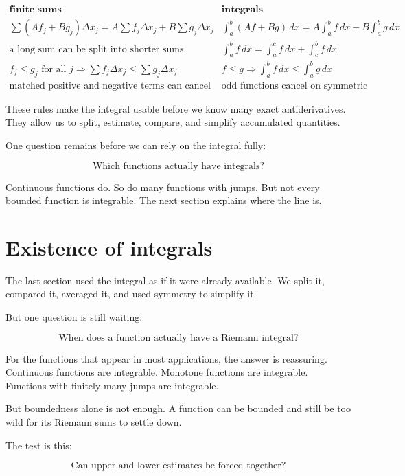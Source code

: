 \[
\begin{array}{c|c}
\textbf{finite sums} & \textbf{integrals} \\ \hline
\sum (Af_j+Bg_j)\Delta x_j
=
A\sum f_j\Delta x_j+B\sum g_j\Delta x_j
&
\int_a^b (Af+Bg)\,dx
=
A\int_a^b f\,dx+B\int_a^b g\,dx
\\[2mm]
\text{a long sum can be split into shorter sums}
&
\int_a^b f\,dx
=
\int_a^c f\,dx+\int_c^b f\,dx
\\[2mm]
f_j\le g_j \text{ for all }j
\Rightarrow
\sum f_j\Delta x_j\le \sum g_j\Delta x_j
&
f\le g
\Rightarrow
\int_a^b f\,dx\le \int_a^b g\,dx
\\[2mm]
\text{matched positive and negative terms can cancel}
&
\text{odd functions cancel on symmetric intervals}
\end{array}
\]

These rules make the integral usable before we know many exact antiderivatives.  They
allow us to split, estimate, compare, and simplify accumulated quantities.

One question remains before we can rely on the integral fully:

\[
\text{Which functions actually have integrals?}
\]

Continuous functions do.  So do many functions with jumps.  But not every bounded
function is integrable.  The next section explains where the line is.
\section{Existence of integrals}
\label{sec:existence-of-integrals}

The last section used the integral as if it were already available.  We split it, compared
it, averaged it, and used symmetry to simplify it.

But one question is still waiting:

\[
\text{When does a function actually have a Riemann integral?}
\]

For the functions that appear in most applications, the answer is reassuring.  Continuous
functions are integrable.  Monotone functions are integrable.  Functions with finitely
many jumps are integrable.

But boundedness alone is not enough.  A function can be bounded and still be too
wild for its Riemann sums to settle down.

The test is this:

\[
\text{Can upper and lower estimates be forced together?}
\]


